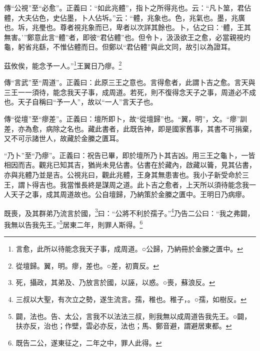 {\noindent\zhuan{}\fzbyks 傳“公視”至“必愈”。正義曰：“如此兆體”，指卜之所得兆也。云：“凡卜筮，君佔體，大夫佔色，史佔墨，卜人佔坼。”云：“體，兆象也。色，兆氣也。墨，兆廣也。坼，兆璺也。尊者視兆象而已，卑者以次詳其餘也。卜，佔之曰：‘體，王其無害。’”鄭意此言“體”者，即彼“君佔體”也。但令卜，汲汲欲王之愈，必當親視灼龜，躬省兆繇，不惟佔體而日。但鄭以“君佔體”與此文同，故引以為證耳。 \par}

茲攸俟，能念予一人。”\footnote{言愈，此所以待能念我天子事，成周道。○公歸，乃納冊於金縢之匱中。}王翼日乃瘳。\footnote{從壇歸。翼，明。瘳，差也。○差，初賣反。}

{\noindent\zhuan{}\fzbyks 傳“言武”至“周道”。正義曰：此原三王之意也。言得愈者，此謂卜吉之愈。言天與三王一一須待，能念我天子事，成周道。若死，則不復得念天子之事，周道必不成也。天子自稱曰“予一人”，故以“一人”言天子也。 \par}

{\noindent\zhuan{}\fzbyks 傳“從壇”至“瘳差”。正義曰：壇所即卜，故“從壇歸”也。“翼，明”，文。“瘳”訓差，亦為愈，病除之名也。藏此書者，此既告神，即是國家舊事，其書不可捐棄，又不可示諸世人，故藏於金縢之匱耳。 \par}

{\noindent\shu{}\fzkt “乃卜”至“乃瘳”。正義曰：祝告已畢，即於壇所乃卜其吉凶。用三王之龜卜，一皆相因而吉。觀兆已知其吉，猶尚未見佔書。佔書在於藏內，啟藏以籥，見其佔書，亦與兆體乃並是吉。公視兆曰，觀此兆體，王身其無患害也。我小子新受命於三王，謂卜得吉也。我當惟長終是謀周之道。此卜吉之愈者，上天所以須待能念我一人天子之事，成其周道故也。公自壇歸，乃納策於金縢之匱中。王明日乃病瘳。 \par}

既喪，及其群弟乃流言於國，\footnote{死，攝政，其弟及、乃放言於國，以誣，以惑。○喪，蘇浪反。}曰：“公將不利於孺子。”\footnote{三叔以大聖，有次立之勢，遂生流言。孺，稚也。稚子，。○孺，如樹反。}乃告二公曰：“我之弗闢，我無以告我先王。”\footnote{闢，法也。告、太公，言我不以法法三叔，則我無以成周道告我先王。○闢，扶亦反，治也；作壁，雲必亦反，法也；馬、鄭音避，謂避居東都。}居東二年，則罪人斯得。\footnote{既告二公，遂東征之，二年之中，罪人此得。}


